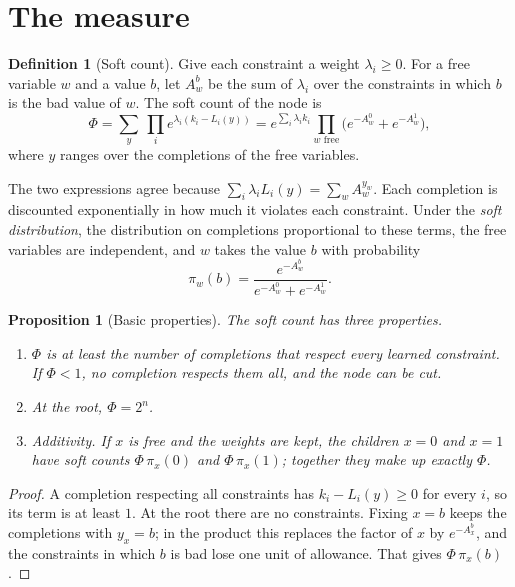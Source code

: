 \documentclass[11pt,a4paper]{article}
\newtheorem{proposition}[lemma]{Proposition}
\theoremstyle{definition}
\newtheorem{definition}[lemma]{Definition}
\begin{document}
\section{The measure}

\begin{definition}[Soft count]
Give each constraint a weight $\lambda_i\ge0$. For a free variable $w$ and a
value $b$, let $A_w^b$ be the sum of $\lambda_i$ over the constraints in which
$b$ is the bad value of $w$. The soft count of the node is
\[
 \Phi=\sum_y\ \prod_i e^{\lambda_i(k_i-L_i(y))}
     =e^{\sum_i\lambda_ik_i}\prod_{w\text{ free}}
      \bigl(e^{-A_w^0}+e^{-A_w^1}\bigr),
\]
where $y$ ranges over the completions of the free variables.
\end{definition}

The two expressions agree because $\sum_i\lambda_iL_i(y)=\sum_wA_w^{y_w}$.
Each completion is discounted exponentially in how much it violates each
constraint. Under the \emph{soft distribution}, the distribution on completions
proportional to these terms, the free variables are independent, and $w$
takes the value $b$ with probability
\[
 \pi_w(b)=\frac{e^{-A_w^b}}{e^{-A_w^0}+e^{-A_w^1}} .
\]

\begin{proposition}[Basic properties]\label{prop:basic}
The soft count has three properties.
\begin{enumerate}
 \item $\Phi$ is at least the number of completions that respect every learned
 constraint. If $\Phi<1$, no completion respects them all, and the node can
 be cut.
 \item At the root, $\Phi=2^n$.
 \item \emph{Additivity.} If $x$ is free and the weights are kept, the
 children $x=0$ and $x=1$ have soft counts $\Phi\,\pi_x(0)$ and
 $\Phi\,\pi_x(1)$; together they make up exactly $\Phi$.
\end{enumerate}
\end{proposition}

\begin{proof}
A completion respecting all constraints has $k_i-L_i(y)\ge0$ for every $i$,
so its term is at least $1$. At the root there are no constraints. Fixing
$x=b$ keeps the completions with $y_x=b$; in the product this replaces the
factor of $x$ by $e^{-A_x^b}$, and the constraints in which $b$ is bad lose
one unit of allowance. That gives $\Phi\,\pi_x(b)$.
\end{proof}
\end{document}
